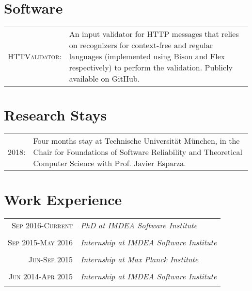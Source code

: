 \documentclass[a4paper,10pt]{article} %
\begin{document}
\section{Software}

\begin{tabular}{rp{11cm}}
\textsc{HTTValidator}: & An input validator for HTTP messages that relies on recognizers for context-free and regular languages (implemented using Bison and Flex respectively) to perform the validation. Publicly available on GitHub. \\
\end{tabular}


\section{Research Stays}

\begin{tabular}{rp{13cm}}
\textsc{2018}: & Four months stay at Technische Universität München, in the Chair for Foundations of Software Reliability and Theoretical Computer Science with Prof. Javier Esparza. \\
\end{tabular}


\section{Work Experience}

\begin{tabular}{r|p{11cm}}
\textsc{Sep 2016-Current} & \emph{PhD at IMDEA Software Institute}\\
\multicolumn{2}{c}{} \\

\textsc{Sep 2015-May 2016} & \emph{Internship at IMDEA Software Institute}\\
\multicolumn{2}{c}{} \\

\textsc{Jun-Sep 2015} & \emph{Internship at Max Planck Institute}\\
\multicolumn{2}{c}{} \\

\textsc{Jun 2014-Apr 2015} & \emph{Internship at IMDEA Software Institute}\\
\multicolumn{2}{c}{} \\
\end{tabular}
\end{document}
